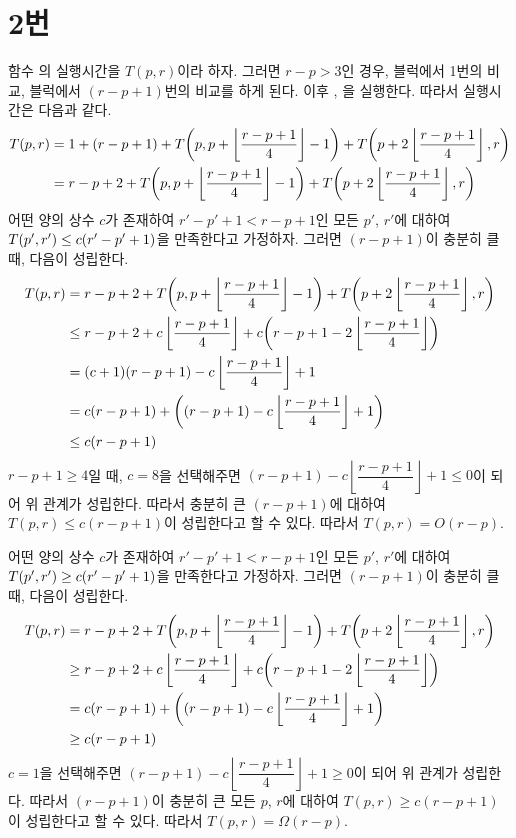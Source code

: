 \documentclass[10pt]{article}
\begin{document}
\section*{2번}

함수 의 실행시간을 $T(p, r)$이라 하자. 
그러면 $r-p > 3$인 경우,  블럭에서 1번의 비교,  블럭에서 $(r-p+1)$번의 비교를 하게 된다. 
이후 , 을 실행한다. 따라서 실행시간은 다음과 같다.
\begin{align*}
    T(p, r) &= 1 + (r-p+1) + T\qty(p, p + \left\lfloor\frac{r-p+1}{4}\right\rfloor - 1) + T\qty(p + 2\left\lfloor\frac{r-p+1}{4}\right\rfloor, r) \\
    &= r-p+2 + T\qty(p, p + \left\lfloor\frac{r-p+1}{4}\right\rfloor - 1) + T\qty(p + 2\left\lfloor\frac{r-p+1}{4}\right\rfloor, r)
\end{align*}
어떤 양의 상수 $c$가 존재하여 $r'-p'+1 < r-p+1$인 모든 $p'$, $r'$에 대하여 $T(p', r') \leq c\qty(r'-p'+1)$을 만족한다고 가정하자. 그러면 $(r-p+1)$이 충분히 클 때, 다음이 성립한다.
\begin{align*}
    T(p, r) &= r-p+2 + T\qty(p, p + \left\lfloor\frac{r-p+1}{4}\right\rfloor - 1) + T\qty(p + 2\left\lfloor\frac{r-p+1}{4}\right\rfloor, r) \\
    &\leq r-p+2 + c\left\lfloor\frac{r-p+1}{4}\right\rfloor + c\qty(r-p+1 - 2\left\lfloor\frac{r-p+1}{4}\right\rfloor) \\
    &= (c+1)(r-p+1) - c\left\lfloor\frac{r-p+1}{4}\right\rfloor + 1 \\
    &= c(r-p+1) + \qty((r-p+1) - c\left\lfloor\frac{r-p+1}{4}\right\rfloor + 1) \\
    &\leq c(r-p+1)
\end{align*}
$r-p+1 \geq 4$일 때, $c = 8$을 선택해주면 $(r-p+1) - c\left\lfloor\dfrac{r-p+1}{4}\right\rfloor + 1 \leq 0$이 되어 위 관계가 성립한다. 따라서 충분히 큰 $(r-p+1)$에 대하여 $T(p, r) \leq c(r-p+1)$이 성립한다고 할 수 있다. 따라서 $T(p, r) = O(r-p)$.

\vspace{3mm}
어떤 양의 상수 $c$가 존재하여 $r'-p'+1 < r-p+1$인 모든 $p'$, $r'$에 대하여 $T(p', r') \geq c\qty(r'-p'+1)$을 만족한다고 가정하자. 그러면 $(r-p+1)$이 충분히 클 때, 다음이 성립한다.
\begin{align*}
    T(p, r) &= r-p+2 + T\qty(p, p + \left\lfloor\frac{r-p+1}{4}\right\rfloor - 1) + T\qty(p + 2\left\lfloor\frac{r-p+1}{4}\right\rfloor, r) \\
    &\geq r-p+2 + c\left\lfloor\frac{r-p+1}{4}\right\rfloor + c\qty(r-p+1 - 2\left\lfloor\frac{r-p+1}{4}\right\rfloor) \\
    &= c(r-p+1) + \qty((r-p+1) - c\left\lfloor\frac{r-p+1}{4}\right\rfloor + 1) \\
    &\geq c(r-p+1)
\end{align*}
$c = 1$을 선택해주면 $(r-p+1) - c\left\lfloor\dfrac{r-p+1}{4}\right\rfloor + 1 \geq 0$이 되어 위 관계가 성립한다. 따라서 $(r-p+1)$이 충분히 큰 모든 $p$, $r$에 대하여 $T(p, r) \geq c(r-p+1)$이 성립한다고 할 수 있다. 따라서 $T(p, r) = \Omega(r-p)$.
\end{document}
